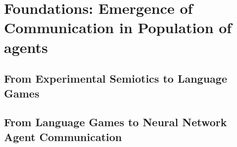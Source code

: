 \chapter{Foundations: Emergence of Communication in Population of agents}
\label{chap:foundation_formation}
\minitoc


\section{From Experimental Semiotics to Language Games}

\section{From Language Games to Neural Network Agent Communication}

